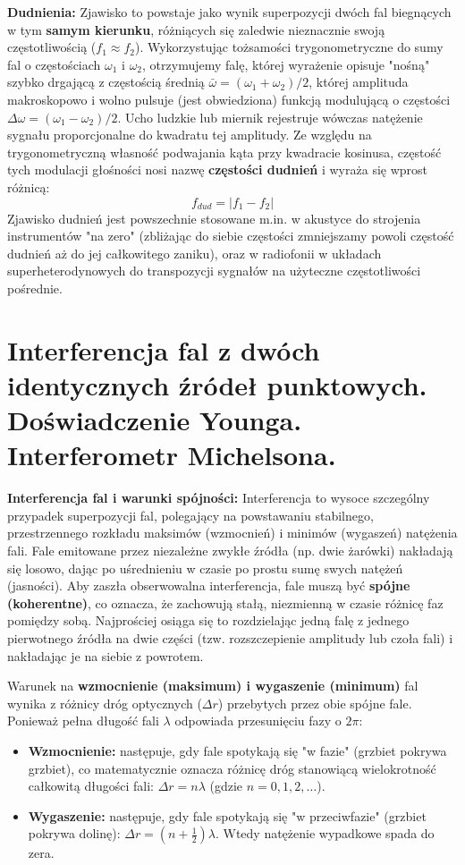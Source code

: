 \documentclass[11pt, a4paper]{article}
\begin{document}
\textbf{Dudnienia:}
Zjawisko to powstaje jako wynik superpozycji dwóch fal biegnących w tym \textbf{samym kierunku}, różniących się zaledwie nieznacznie swoją częstotliwością ($f_1 \approx f_2$). Wykorzystując tożsamości trygonometryczne do sumy fal o częstościach $\omega_1$ i $\omega_2$, otrzymujemy falę, której wyrażenie opisuje "nośną" szybko drgającą z częstością średnią $\bar{\omega} = (\omega_1 + \omega_2)/2$, której amplituda makroskopowo i wolno pulsuje (jest obwiedziona) funkcją modulującą o częstości $\Delta\omega = (\omega_1 - \omega_2)/2$.
Ucho ludzkie lub miernik rejestruje wówczas natężenie sygnału proporcjonalne do kwadratu tej amplitudy. Ze względu na trygonometryczną własność podwajania kąta przy kwadracie kosinusa, częstość tych modulacji głośności nosi nazwę \textbf{częstości dudnień} i wyraża się wprost różnicą:
\[
f_{dud} = |f_1 - f_2|
\]
Zjawisko dudnień jest powszechnie stosowane m.in. w akustyce do strojenia instrumentów "na zero" (zbliżając do siebie częstości zmniejszamy powoli częstość dudnień aż do jej całkowitego zaniku), oraz w radiofonii w układach superheterodynowych do transpozycji sygnałów na użyteczne częstotliwości pośrednie.

\section{Interferencja fal z dwóch identycznych źródeł punktowych. Doświadczenie Younga. Interferometr Michelsona.}

\textbf{Interferencja fal i warunki spójności:}
Interferencja to wysoce szczególny przypadek superpozycji fal, polegający na powstawaniu stabilnego, przestrzennego rozkładu maksimów (wzmocnień) i minimów (wygaszeń) natężenia fali. Fale emitowane przez niezależne zwykłe źródła (np. dwie żarówki) nakładają się losowo, dając po uśrednieniu w czasie po prostu sumę swych natężeń (jasności). Aby zaszła obserwowalna interferencja, fale muszą być \textbf{spójne (koherentne)}, co oznacza, że zachowują stałą, niezmienną w czasie różnicę faz pomiędzy sobą. Najprościej osiąga się to rozdzielając jedną falę z jednego pierwotnego źródła na dwie części (tzw. rozszczepienie amplitudy lub czoła fali) i nakładając je na siebie z powrotem.

Warunek na \textbf{wzmocnienie (maksimum) i wygaszenie (minimum)} fal wynika z różnicy dróg optycznych ($\Delta r$) przebytych przez obie spójne fale. Ponieważ pełna długość fali $\lambda$ odpowiada przesunięciu fazy o $2\pi$:
\begin{itemize}
    \item \textbf{Wzmocnienie:} następuje, gdy fale spotykają się "w fazie" (grzbiet pokrywa grzbiet), co matematycznie oznacza różnicę dróg stanowiącą wielokrotność całkowitą długości fali: $\Delta r = n\lambda$ (gdzie $n = 0, 1, 2, \dots$).
    \item \textbf{Wygaszenie:} następuje, gdy fale spotykają się "w przeciwfazie" (grzbiet pokrywa dolinę): $\Delta r = (n + \frac{1}{2})\lambda$. Wtedy natężenie wypadkowe spada do zera.
\end{itemize}
\end{document}
